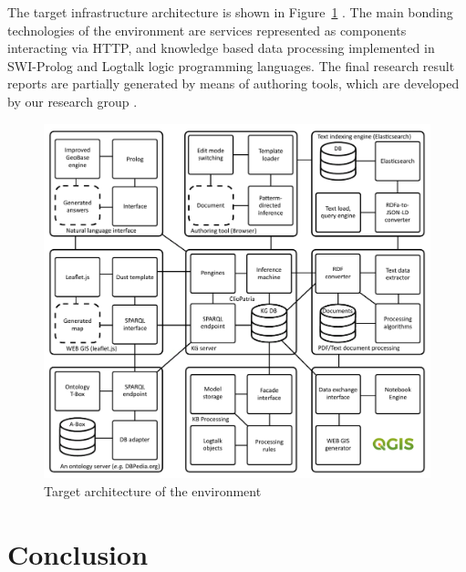 \documentclass[
]{ceurart}
\begin{document}
The target infrastructure architecture is shown in Figure~\ref{fig:target} \cite{zont19}.  The main bonding technologies of the environment are services represented as components interacting via HTTP, and knowledge based data processing implemented in SWI-Prolog and Logtalk logic programming languages.  The final research result reports are partially generated by means of authoring tools, which are developed by our research group \cite{authoring}.
\begin{figure}
  \centering
  \includegraphics[width=0.8\linewidth]{architecture.pdf}
  \caption{Target architecture of the environment}
  \label{fig:target}
\end{figure}

\section*{Conclusion}
\end{document}
